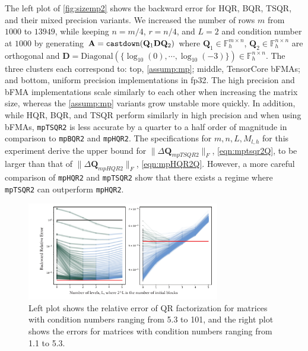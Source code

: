 \documentclass[review,onefignum,onetabnum]{siamart190516}
\newcommand{\F}{\mathbb{F}}
\newcommand{\bb}[1]{\mathbf{#1}}
\begin{document}
The left plot of \cref{fig:sizemp2} shows the backward error for HQR, BQR, TSQR, and their mixed precision variants.
We increased the number of rows $m$ from $1000$ to $13949$, 
while keeping $n=m/4$, $r=n/4$, and $L=2$ and condition number at $1000$ by generating $\bb{A}={\tt castdown}(\bb{Q}_1\bb{D}\bb{Q}_2)$ where $\bb{Q}_1\in\F_h^{m\times n}$, $\bb{Q}_2\in\F_h^{n\times n}$ are orthogonal and $\bb{D}=\mathrm{Diagonal}(\{\log_{10}(0),\cdots, \log_{10}(-3)\})\in\F_h^{n\times n}$.  
The three clusters each correspond to: top, \cref{assump:mp}; middle, TensorCore bFMAs; and bottom, uniform precision implementations in fp32.
The high precision and bFMA implementations scale similarly to each other when increasing the matrix size, whereas the \cref{assump:mp} variants grow unstable more quickly.
In addition, while HQR, BQR, and TSQR perform similarly in high precision and when using bFMAs, {\tt mpTSQR2} is less accurate by a quarter to a half order of magnitude in comparison to {\tt mpBQR2} and {\tt mpHQR2}.
The specifications for $m,n,L,M_{l,h}$ for this experiment derive the upper bound for $\|\Delta \bb{Q}_{mpTSQR2}\|_F$, \cref{eqn:mptsqr2Q}, to be larger than that of $\|\Delta \bb{Q}_{mpHQR2}\|_F$, \cref{eqn:mpHQR2Q}.
However, a more careful comparison of {\tt mpHQR2} and {\tt mpTSQR2} show that there exists a regime where {\tt mpTSQR2} can outperform {\tt mpHQR2}.\par
\begin{figure}[h!]%
	\centering
	\includegraphics[width=0.75\textwidth]{./figures/allTSQR2.pdf}
	\caption{\label{fig:allTSQR} Left plot shows the relative error of QR factorization for matrices with condition numbers ranging from 5.3 to 101, and the right plot shows the errors for matrices with condition numbers ranging from 1.1 to 5.3. }
	\vspace{-10pt}
\end{figure}
\end{document}
